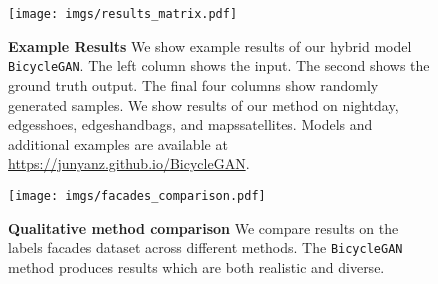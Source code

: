 \documentclass{article}
\newcommand{\bicycle}{\texttt{BicycleGAN}\xspace} \newcommand{\G}{G\xspace}
\begin{document}
\vspace{-1mm} 
\begin{figure}
\centering
\texttt{[image: imgs/results\_matrix.pdf]}
\caption{\small \textbf{Example Results} We show example results of our hybrid model \bicycle. The left column shows the input. The second shows the ground truth output. The final four columns show randomly generated samples. We show results of our method on nightday, edgesshoes, edgeshandbags, and mapssatellites. Models and additional examples are available at \url{https://junyanz.github.io/BicycleGAN}.} 
\vspace{-2mm}
\label{fig:results}
\end{figure}

\begin{figure}
\centering
\hspace{\linewidth}
\texttt{[image: imgs/facades\_comparison.pdf]}
\caption{\small \textbf{Qualitative method comparison} We compare results on the labels  facades dataset across different methods. The \bicycle method produces results which are both realistic and diverse.}
\label{fig:resultsFacades}
\end{figure}
\end{document}
